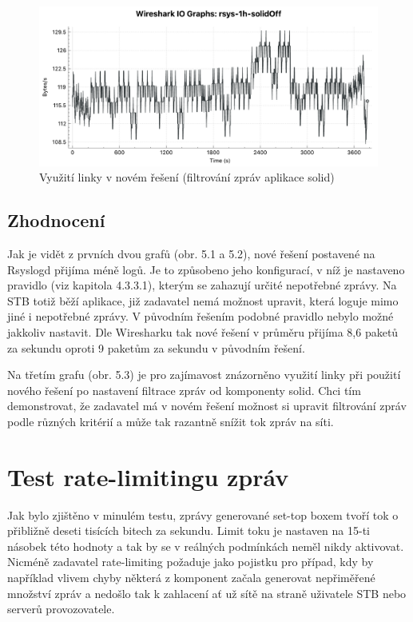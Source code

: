 \documentclass[thesis=B,czech]{FITthesis}[2012/06/26]
\begin{document}
\begin{figure}[H]
	\centering
	\includegraphics[scale=0.44]{images/test-1h-rsys-solidoff}
	\caption[Využití linky v novém řešení (filtrování zpráv aplikace solid)]{Využití linky v novém řešení (filtrování zpráv aplikace solid)}
\end{figure}

\subsection*{Zhodnocení}
Jak je vidět z prvních dvou grafů (obr. 5.1 a 5.2), nové řešení postavené na Rsyslogd přijíma méně logů. Je to způsobeno jeho konfigurací, v níž je nastaveno pravidlo (viz kapitola 4.3.3.1), kterým se zahazují určité nepotřebné zprávy. Na STB totiž běží aplikace, již zadavatel nemá možnost upravit, která loguje mimo jiné i nepotřebné zprávy. V původním řešením podobné pravidlo nebylo možné jakkoliv nastavit.
Dle Wiresharku tak nové řešení v průměru přijíma 8,6 paketů za sekundu oproti 9 paketům za sekundu v původním řešení.

Na třetím grafu (obr. 5.3) je pro zajímavost znázorněno využití linky při použití nového řešení po nastavení filtrace zpráv od komponenty solid.
Chci tím demonstrovat, že zadavatel má v novém řešení možnost si upravit filtrování zpráv podle různých kritérií a může tak razantně snížit tok zpráv na síti.

\section{Test rate-limitingu zpráv}
Jak bylo zjištěno v minulém testu, zprávy generované set-top boxem tvoří tok o přibližně deseti tisících bitech za sekundu. Limit toku je nastaven na 15-ti násobek této hodnoty a tak by se v reálných podmínkách neměl nikdy aktivovat. Nicméně zadavatel rate-limiting požaduje jako pojistku pro případ, kdy by například vlivem chyby některá z komponent začala generovat nepřiměřené množství zpráv a nedošlo tak k zahlacení ať už sítě na straně uživatele STB nebo serverů provozovatele.
\end{document}
